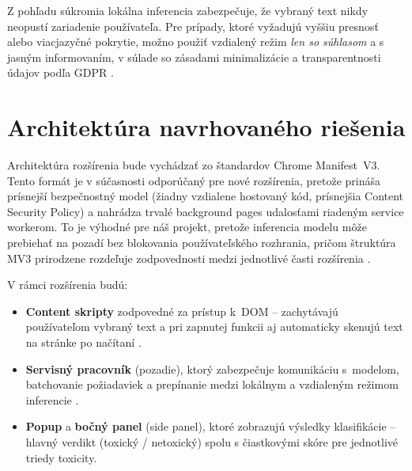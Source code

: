 Z pohľadu súkromia lokálna inferencia zabezpečuje, že vybraný text nikdy neopustí zariadenie používateľa. Pre prípady, ktoré vyžadujú vyššiu presnosť alebo viacjazyčné pokrytie, možno použiť vzdialený režim \emph{len so súhlasom} a s jasným informovaním, v súlade so zásadami minimalizácie a transparentnosti údajov podľa GDPR \cite{tfjsToxicity}\cite{chromemv3}\cite{edpb2019dpbdd}.

\section{Architektúra navrhovaného riešenia}
Architektúra rozšírenia bude vychádzať zo štandardov Chrome Manifest~V3. Tento formát je v súčasnosti odporúčaný pre nové rozšírenia, pretože prináša prísnejší bezpečnostný model (žiadny vzdialene hostovaný kód, prísnejšia Content Security Policy) a nahrádza trvalé background pages udalosťami riadeným service workerom. To je výhodné pre náš projekt, pretože inferencia modelu môže prebiehať na pozadí bez blokovania používateľského rozhrania, pričom štruktúra MV3 prirodzene rozdeľuje zodpovednosti medzi jednotlivé časti rozšírenia \cite{chromemv3}\cite{chromeCSP}\cite{chromeServiceWorkers}\cite{chromeContentScripts}\cite{chromeMessaging}.

V rámci rozšírenia budú:
\begin{itemize}
  \item \textbf{Content skripty} zodpovedné za prístup k~DOM -- zachytávajú používateľom vybraný text a pri zapnutej funkcii aj automaticky skenujú text na stránke po načítaní \cite{chromeContentScripts}.
  \item \textbf{Servisný pracovník} (pozadie), ktorý zabezpečuje komunikáciu s~modelom, batchovanie požiadaviek a prepínanie medzi lokálnym a vzdialeným režimom inferencie \cite{chromeServiceWorkers}\cite{chromeMessaging}.
  \item \textbf{Popup} a \textbf{bočný panel} (side panel), ktoré zobrazujú výsledky klasifikácie -- hlavný verdikt (toxický / netoxický) spolu s čiastkovými skóre pre jednotlivé triedy toxicity.
\end{itemize}

